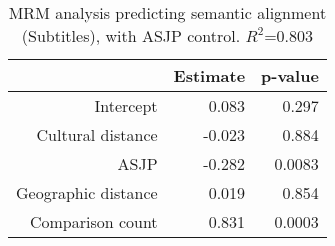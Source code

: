 \begin{table}[ht]
\centering
\begin{tabular}{rrr}
  \hline
 & Estimate & p-value \\ 
  \hline
Intercept & 0.083 & 0.297 \\ 
  Cultural distance & -0.023 & 0.884 \\ 
  ASJP & -0.282 & 0.0083 \\ 
  Geographic distance & 0.019 & 0.854 \\ 
  Comparison count & 0.831 & 0.0003 \\ 
   \hline
\end{tabular}
\caption{MRM analysis predicting semantic alignment (Subtitles), with ASJP control. $R^2$=0.803} 
\end{table}
